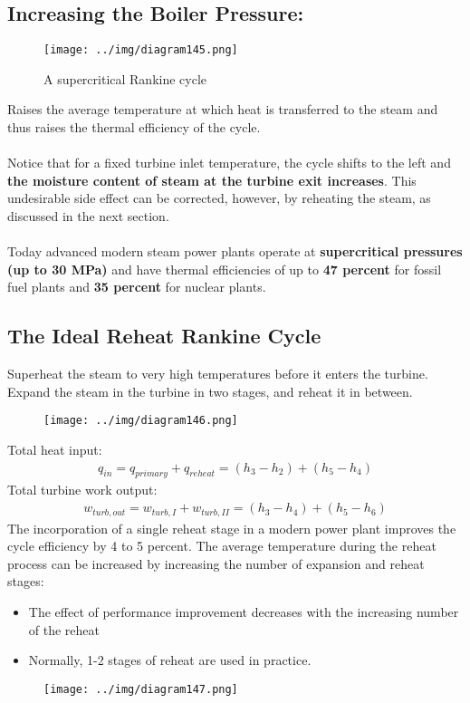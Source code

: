 \documentclass[class=report, crop=false, 12pt,a4paper]{standalone}
\numberwithin{equation}{section}
\begin{document}
\subsection*{Increasing the Boiler Pressure:}
\begin{figure}[H]
  \centering
  \texttt{[image: ../img/diagram145.png]}
  \caption{A supercritical Rankine cycle}
\end{figure}
Raises the average temperature at which heat is transferred to the steam and thus raises the thermal efficiency of the cycle. \\\\
Notice that for a fixed turbine inlet temperature, the cycle shifts to the left and \textbf{the moisture content of steam at the turbine exit increases}. This undesirable side effect can be corrected, however, by reheating the steam, as discussed in the next section. \\\\
Today advanced modern steam power plants operate at \textbf{supercritical pressures (up to 30 MPa)} and have thermal efficiencies of up to \textbf{47 percent} for fossil fuel plants and \textbf{35 percent} for nuclear plants.
\subsection{The Ideal Reheat Rankine Cycle}
Superheat the steam to very high temperatures before it enters the turbine. 
Expand the steam in the turbine in two stages, and reheat it in between. 
\begin{figure}[H]
  \centering
  \texttt{[image: ../img/diagram146.png]}
  \caption{}
\end{figure}
Total heat input:
\begin{gather}
  q_{in} = q_{primary} + q_{reheat} = (h_3-h_2) + (h_5-h_4)
\end{gather}
Total turbine work output:
\begin{gather}
  w_{turb,out} = w_{turb,I} + w_{turb,II} = (h_3-h_4) + (h_5-h_6)
\end{gather}
The incorporation of a single reheat stage in a modern power plant improves the cycle efficiency by 4 to 5 percent. The average temperature during the reheat process can be increased by increasing the number of expansion and reheat stages:
\begin{itemize}[noitemsep]
  \item The effect of performance improvement decreases with the increasing number of the reheat
  \item Normally, 1-2 stages of reheat are used in practice.
\end{itemize}
\begin{figure}[H]
  \centering
  \texttt{[image: ../img/diagram147.png]}
  \caption{}
\end{figure}
\end{document}
